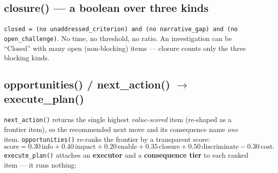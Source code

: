 \documentclass[11pt]{article}
\newcommand{\code}[1]{\texttt{\small #1}}
\begin{document}
\subsection*{closure() --- a boolean over three kinds}
\code{closed = (no unaddressed\_criterion) and (no narrative\_gap) and (no open\_challenge)}.
No time, no threshold, no ratio. An investigation can be ``Closed'' with many open
(non-blocking) items --- closure counts only the three blocking kinds.

\subsection*{opportunities() / next\_action() $\rightarrow$ execute\_plan()}
\code{next\_action()} returns the single highest \emph{value-scored} item (re-shaped as a frontier
item), so the recommended next move and its consequence name \emph{one} item.
\code{opportunities()} re-ranks the frontier by a transparent score:
\[
\text{score} = 0.30\,\text{info} + 0.40\,\text{impact} + 0.20\,\text{enable}
+ 0.35\,\text{closure} + 0.50\,\text{discriminate} - 0.30\,\text{cost}.
\]
\code{execute\_plan()} attaches an \textbf{executor} and a \textbf{consequence tier} to each ranked
item --- it runs nothing:
\end{document}
